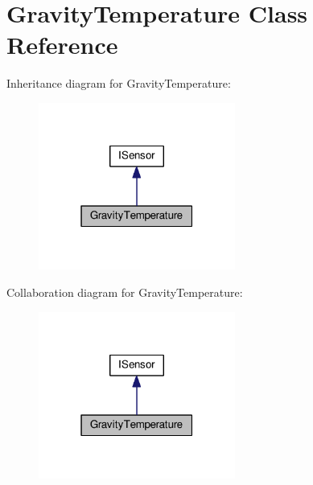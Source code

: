 \hypertarget{class_gravity_temperature}{}\section{Gravity\+Temperature Class Reference}
\label{class_gravity_temperature}


Inheritance diagram for Gravity\+Temperature\+:\nopagebreak
\begin{figure}[H]
\begin{center}
\leavevmode
\includegraphics[width=183pt]{class_gravity_temperature__inherit__graph}
\end{center}
\end{figure}


Collaboration diagram for Gravity\+Temperature\+:\nopagebreak
\begin{figure}[H]
\begin{center}
\leavevmode
\includegraphics[width=183pt]{class_gravity_temperature__coll__graph}
\end{center}
\end{figure}
